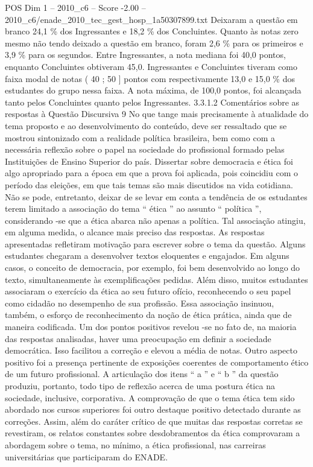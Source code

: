 \begin{textsample}{POS Dim 1 – 2010\_c6 – Score -2.00 – 2010\_c6/enade\_2010\_tec\_gest\_hosp\_1a50307899.txt}
Deixaram a questão em branco 24,1 \% dos Ingressantes e 18,2 \% dos Concluintes.
Quanto às notas zero mesmo não tendo deixado a questão em branco, foram 2,6 \% para os primeiros e 3,9 \% para os segundos.
Entre Ingressantes, a nota mediana foi 40,0 pontos, enquanto Concluintes obtiveram 45,0.
Ingressantes e Concluintes tiveram como faixa modal de notas ( 40 ; 50 ] pontos com respectivamente 13,0 e 15,0 \% dos estudantes do grupo nessa faixa.
A nota máxima, de 100,0 pontos, foi alcançada tanto pelos Concluintes quanto pelos Ingressantes. 3.3.1.2 Comentários sobre as respostas à Questão Discursiva 9 No que tange mais precisamente à atualidade do tema proposto e ao desenvolvimento do conteúdo, deve ser ressaltado que se mostrou sintonizado com a realidade política brasileira, bem como com a necessária reflexão sobre o papel na sociedade do profissional formado pelas Instituições de Ensino Superior do país.
Dissertar sobre democracia e ética foi algo apropriado para a época em que a prova foi aplicada, pois coincidiu com o período das eleições, em que tais temas são mais discutidos na vida cotidiana.
Não se pode, entretanto, deixar de se levar em conta a tendência de os estudantes terem limitado a associação do tema “ ética ” ao assunto “ política ”, considerando -se que a ética abarca não apenas a política.
Tal associação atingiu, em alguma medida, o alcance mais preciso das respostas.
As respostas apresentadas refletiram motivação para escrever sobre o tema da questão.
Alguns estudantes chegaram a desenvolver textos eloquentes e engajados.
Em alguns casos, o conceito de democracia, por exemplo, foi bem desenvolvido ao longo do texto, simultaneamente às exemplificações pedidas.
Além disso, muitos estudantes associaram o exercício da ética ao seu futuro ofício, reconhecendo o seu papel como cidadão no desempenho de sua profissão.
Essa associação insinuou, também, o esforço de reconhecimento da noção de ética prática, ainda que de maneira codificada.
Um dos pontos positivos revelou -se no fato de, na maioria das respostas analisadas, haver uma preocupação em definir a sociedade democrática.
Isso facilitou a correção e elevou a média de notas.
Outro aspecto positivo foi a presença pertinente de exposições coerentes de comportamento ético de um futuro profissional.
A articulação dos itens “ a ” e “ b ” da questão produziu, portanto, todo tipo de reflexão acerca de uma postura ética na sociedade, inclusive, corporativa.
A comprovação de que o tema ética tem sido abordado nos cursos superiores foi outro destaque positivo detectado durante as correções.
Assim, além do caráter crítico de que muitas das respostas corretas se revestiram, os relatos constantes sobre desdobramentos da ética comprovaram a abordagem sobre o tema, no mínimo, a ética profissional, nas carreiras universitárias que participaram do ENADE.

\end{textsample}
